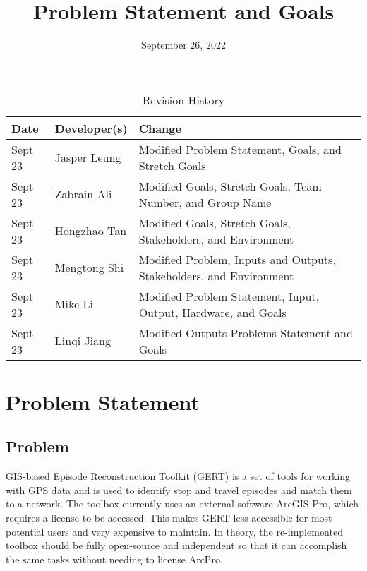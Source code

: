 \documentclass{article}
\title{Problem Statement and Goals\\\progname}
\author{\authname}
\date{September 26, 2022}
\begin{document}
\maketitle

\begin{table}[hp]
\caption{Revision History} \label{TblRevisionHistory}
\begin{tabularx}{\textwidth}{llX}
\toprule
\textbf{Date} & \textbf{Developer(s)} & \textbf{Change}\\
\midrule
Sept 23 & Jasper Leung & Modified Problem Statement, Goals, and Stretch Goals\\
Sept 23 & Zabrain Ali & Modified Goals, Stretch Goals, Team Number, and Group Name\\
Sept 23 & Hongzhao Tan & Modified Goals, Stretch Goals, Stakeholders, and Environment\\
Sept 23 & Mengtong Shi & Modified Problem, Inputs and Outputs, Stakeholders, and Environment\\
Sept 23 & Mike Li & Modified Problem Statement, Input, Output, Hardware, and Goals\\
Sept 23 & Linqi Jiang & Modified Outputs Problems Statement and Goals\\
\bottomrule
\end{tabularx}
\end{table}

\section{Problem Statement}


\subsection{Problem}
GIS-based Episode Reconstruction Toolkit (GERT) is a set of tools for working with GPS data and is used to identify stop and travel episodes and  match them to a network. The toolbox currently uses an external software ArcGIS Pro, which requires a license to be accessed. This makes GERT less accessible for most potential users and very expensive to maintain. In theory, the re-implemented toolbox should be fully open-source and independent so that it can accomplish the same tasks without needing to license ArcPro.
\end{document}

